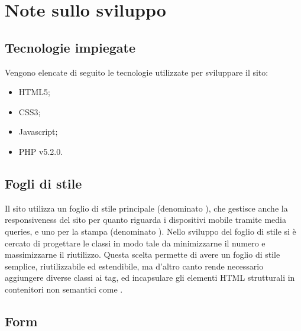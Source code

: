 \documentclass[12pt]{article}
\begin{document}
	\newpage
	\section{Note sullo sviluppo}
	
	\subsection{Tecnologie impiegate}
	
	Vengono elencate di seguito le tecnologie utilizzate per sviluppare il sito:
	
	\begin{itemize}
		\item HTML5;
		\item CSS3;
		\item Javascript;
		\item PHP v5.2.0.
	\end{itemize}
	
	\subsection{Fogli di stile}
	Il sito utilizza un foglio di stile principale (denominato ), che gestisce anche la responsiveness del sito per quanto riguarda i dispositivi mobile tramite media queries, e uno per la stampa (denominato ). Nello sviluppo del foglio di stile si è cercato di progettare le classi in modo tale da minimizzarne il numero e massimizzarne il riutilizzo. Questa scelta permette di avere un foglio di stile semplice, riutilizzabile ed estendibile, ma d'altro canto rende necessario aggiungere diverse classi ai tag, ed incapsulare gli elementi HTML strutturali in contenitori non semantici come . 
	
	\subsection{Form}
\end{document}
